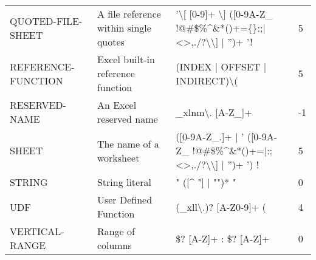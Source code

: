 \begin{tabular}{@{}llll@{}}
QUOTED-FILE-SHEET & A file reference within single quotes & '\textbackslash[ [0-9]+ \textbackslash] ([0-9A-Z\_ !@\#\$\%\textasciicircum{}\&*()\-+=\{\}:;$\mid$\textless\textgreater,./?\textbackslash{}\textbackslash{}] $\mid$ '')+ '!
& 5        \\
REFERENCE-FUNCTION & Excel built-in reference function & (INDEX $\mid$ OFFSET $\mid$ INDIRECT)\textbackslash( & 5 \\
RESERVED-NAME & An Excel reserved name & \_xlnm\textbackslash.  [A-Z\_]+ & -1 \\
SHEET & The name of a worksheet &
	([0-9A-Z\_.]+ $\mid$ ' ([0-9A-Z\_ !@\#\$\%\textasciicircum{}\&*()\-+={}$\mid$:;\textless\textgreater,./?\textbackslash\textbackslash] $\mid$ '')+ ') !
& 5        \\
STRING & String literal & " ([\textasciicircum{} "] $\mid$ "")* " & 0       \\
UDF & User Defined Function & (\_xll\textbackslash.)? [A-Z0-9]+  ( & 4 \\
VERTICAL-RANGE & Range of columns & \$? [A-Z]+ : \$? [A-Z]+ & 0 \\ 
\bottomrule
\end{tabular}
